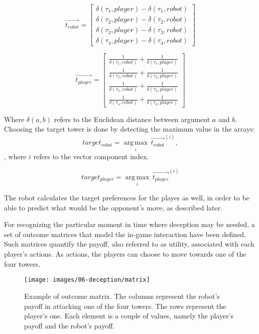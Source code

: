 \begin{equation}
\overrightarrow{t_{robot}} = \begin{bmatrix}
\delta(\tau_{1},player) -\delta(\tau_{1},robot)  \\ 
\delta(\tau_{2},player) - \delta(\tau_{2},robot)  \\
\delta(\tau_{3},player) - \delta(\tau_{3},robot) \\
\delta(\tau_{4},player) - \delta(\tau_{4},robot)
\end{bmatrix}
\label{eq:array1}
\end{equation}

\begin{equation}
\overrightarrow{t_{player}} = \begin{bmatrix}
\frac{1}{\delta(\tau_{1},robot)} + \frac{1}{\delta(\tau_{1},player)} \\ 
\frac{1}{\delta(\tau_{2},robot)} + \frac{1}{\delta(\tau_{2},player)}  \\
\frac{1}{\delta(\tau_{3},robot)} + \frac{1}{\delta(\tau_{3},player)}  \\
\frac{1}{\delta(\tau_{4},robot)} + \frac{1}{\delta(\tau_{4},player)} 
\end{bmatrix}
\label{eq:array2}
\end{equation}

Where $\delta(a,b)$ refers to the Euclidean distance between argument $a$ and $b$. Choosing the target tower is done by detecting the maximum value in the arrays:
\begin{equation}
target_{robot} = \operatorname*{arg\,max}_i \, \overrightarrow{t_{robot}}^{(i)}, 
\end{equation}, where $i$ refers to the vector component index.

\begin{equation}
target_{player} = \operatorname*{arg\,max}_i \, \overrightarrow{t_{player}}^{(i)}
\end{equation}

The robot calculates the target preferences for the player as well, in order to be able to predict what would be the opponent's move, as described later.

For recognizing the particular moment in time where deception may be needed, a set of outcome matrices that model the in-game interaction have been defined. Such matrices quantify the payoff, also referred to as utility, associated with each player's actions. As actions, the players can choose to move towards one of the four towers. 
\begin{figure}[h]
    \centering
    \texttt{[image: images/06-deception/matrix]}
    \caption{Example of outcome matrix. The columns represent the  robot's payoff in attacking one of the four towers. The rows represent the player's one. Each element is a couple of values, namely the player's payoff and the robot's payoff.}
    \label{fig::matrix}
\end{figure}

